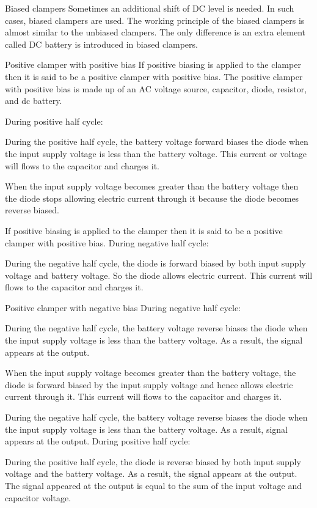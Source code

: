 \documentclass{article}
\begin{document}
Biased clampers
Sometimes an additional shift of DC level is needed. In such cases, biased clampers are used. The working principle of the biased clampers is almost similar to the unbiased clampers. The only difference is an extra element called DC battery is introduced in biased clampers.

Positive clamper with positive bias
If positive biasing is applied to the clamper then it is said to be a positive clamper with positive bias. The positive clamper with positive bias is made up of an AC voltage source, capacitor, diode, resistor, and dc battery.

During positive half cycle:

During the positive half cycle, the battery voltage forward biases the diode when the input supply voltage is less than the battery voltage. This current or voltage will flows to the capacitor and charges it.

When the input supply voltage becomes greater than the battery voltage then the diode stops allowing electric current through it because the diode becomes reverse biased.

If positive biasing is applied to the clamper then it is said to be a positive clamper with positive bias.
During negative half cycle:

During the negative half cycle, the diode is forward biased by both input supply voltage and battery voltage. So the diode allows electric current. This current will flows to the capacitor and charges it.

Positive clamper with negative bias
During negative half cycle:

During the negative half cycle, the battery voltage reverse biases the diode when the input supply voltage is less than the battery voltage. As a result, the signal appears at the output.

When the input supply voltage becomes greater than the battery voltage, the diode is forward biased by the input supply voltage and hence allows electric current through it. This current will flows to the capacitor and charges it.

During the negative half cycle, the battery voltage reverse biases the diode when the input supply voltage is less than the battery voltage. As a result, signal appears at the output.
During positive half cycle:

During the positive half cycle, the diode is reverse biased by both input supply voltage and the battery voltage. As a result, the signal appears at the output. The signal appeared at the output is equal to the sum of the input voltage and capacitor voltage.
\end{document}
